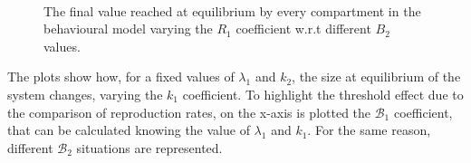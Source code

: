 \begin{figure}[h]
	\centering
	 \quad
	 \\
	\caption[Final Behavioural compartments varying $B_1$]{The final value reached at equilibrium by every compartment in the behavioural model varying the $R_1$ coefficient w.r.t different $B_2$ values.}
	\label{fig:subfig_sensitivity_behavioural_r1}
\end{figure}
The plots show how, for a fixed values of $\lambda_1$ and $k_2$, the size at equilibrium of the system changes, varying the $k_1$ coefficient. To highlight the threshold effect due to the comparison of reproduction rates, on the x-axis is plotted the $\mathcal{B}_1$  coefficient, that can be calculated knowing the value of  $\lambda_1$ and $k_1$. For the same reason, different $\mathcal{B}_2$ situations are represented. 

